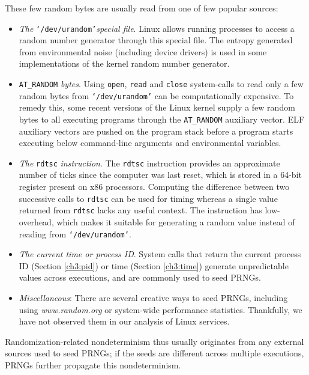 These few random bytes are
usually read from one of few popular sources:
\begin{itemize}
\item {\em The} \texttt{`/dev/urandom'}{\em special file}. Linux allows
running processes to access a random number generator through this
special file. The entropy generated from environmental noise (including
device drivers) is used in some implementations of the kernel random number generator.

\item \texttt{AT\_RANDOM} {\em bytes}.
Using \texttt{open}, \texttt{read} and \texttt{close} system-calls 
to read only a few random bytes from \texttt{`/dev/urandom'} 
can be computationally expensive. 
To remedy this, some 
recent versions of the Linux kernel supply
a few random bytes to all executing programs
through the \texttt{AT\_RANDOM} auxiliary vector.
ELF auxiliary vectors are pushed on the program
stack before a program starts executing below command-line arguments and environmental
variables.

\item {\em The} \texttt{rdtsc} {\em instruction}.
The \texttt{rdtsc} instruction provides an approximate number of ticks since
the computer was last reset, which is stored in a 64-bit register present
on x86 processors. Computing the difference between two successive
calls to \texttt{rdtsc} can be used for timing whereas a single
value returned from \texttt{rdtsc} lacks any useful context.  
The instruction has low-overhead, which makes it suitable for generating a random value
instead of reading from \texttt{`/dev/urandom'}. 

\item {\em The current time or process ID}. 
System calls that return the current
process ID (Section \ref{ch3:pid}) or time (Section \ref{ch3:time})
generate unpredictable values across
executions, and are commonly used to seed PRNGs.

\item {\em Miscellaneous}: There
are several creative ways to seed PRNGs, including 
using {\em www.random.org}
or system-wide performance statistics.
Thankfully, we have not observed them 
in our analysis of Linux services.
\end{itemize}

Randomization-related nondeterminism thus usually originates from
any external sources used to seed PRNGs;
if the seeds are different across multiple
executions, PRNGs further propagate this
nondeterminism.

